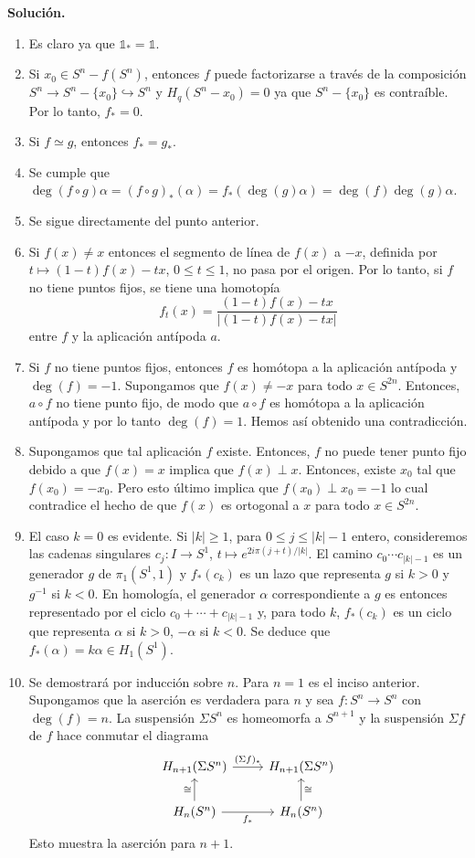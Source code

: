 \documentclass[11pt,a4paper]{article}
\theoremstyle{plain}
\theoremstyle{definition}
\theoremstyle{remark}
\begin{document}
\begin{enumerate}[label=\arabic*.,leftmargin=*]
\noindent\textbf{Solución.}
\begin{enumerate}[label=\alph*)]
\item Es claro ya que $\mathbb 1_*=\mathbb 1$.
\item Si $x_0\in S^n-f(S^n)$, entonces $f$ puede factorizarse a través de
la composición $S^n\to S^n-\{x_0\}\hookrightarrow S^n$ y
$H_q(S^n-x_0)=0$ ya que $S^n-\{x_0\}$ es contraíble. Por lo tanto, $f_*=0$.
\item Si $f\simeq g$, entonces $f_*=g_*$.
\item Se cumple que
$\deg(f\circ g)\alpha=(f\circ g)_*(\alpha)=f_*(\deg(g)\alpha)=\deg(f)\deg(g)\alpha$.
\item Se sigue directamente del punto anterior.
\item Si $f(x)\ne x$ entonces el segmento de línea de $f(x)$ a $-x$,
definida por $t\mapsto(1-t)f(x)-tx$, $0\le t\le1$, no pasa por el origen.
Por lo tanto, si $f$ no tiene puntos fijos, se tiene una homotopía
\[
f_t(x)=\frac{(1-t)f(x)-tx}{|(1-t)f(x)-tx|}
\]
entre $f$ y la aplicación antípoda $a$.
\item Si $f$ no tiene puntos fijos, entonces $f$ es homótopa a la
aplicación antípoda y $\deg(f)=-1$. Supongamos que $f(x)\ne-x$ para todo
$x\in S^{2n}$. Entonces, $a\circ f$ no tiene punto fijo, de modo que
$a\circ f$ es homótopa a la aplicación antípoda y por lo tanto
$\deg(f)=1$. Hemos así obtenido una contradicción.
\item Supongamos que tal aplicación $f$ existe. Entonces, $f$ no puede
tener punto fijo debido a que $f(x)=x$ implica que $f(x)\perp x$. Entonces,
existe $x_0$ tal que $f(x_0)=-x_0$. Pero esto último implica que
$f(x_0)\perp x_0=-1$ lo cual contradice el hecho de que $f(x)$ es ortogonal
a $x$ para todo $x\in S^{2n}$.
\item El caso $k=0$ es evidente. Si $|k|\ge1$, para $0\le j\le|k|-1$
entero, consideremos las cadenas singulares $c_j:I\to S^1$,
$t\mapsto e^{2i\pi(j+t)/|k|}$. El camino $c_0\cdots c_{|k|-1}$ es un
generador $g$ de $\pi_1(S^1,1)$ y $f_*(c_k)$ es un lazo que representa $g$
si $k>0$ y $g^{-1}$ si $k<0$. En homología, el generador $\alpha$
correspondiente a $g$ es entonces representado por el ciclo
$c_0+\cdots+c_{|k|-1}$ y, para todo $k$, $f_*(c_k)$ es un ciclo que
representa $\alpha$ si $k>0$, $-\alpha$ si $k<0$. Se deduce que
$f_*(\alpha)=k\alpha\in H_1(S^1)$.
\item Se demostrará por inducción sobre $n$. Para $n=1$ es el inciso
anterior. Supongamos que la aserción es verdadera para $n$ y sea
$f:S^n\to S^n$ con $\deg(f)=n$. La suspensión $\Sigma S^n$ es homeomorfa a
$S^{n+1}$ y la suspensión $\Sigma f$ de $f$ hace conmutar el diagrama
\[
\begin{tikzcd}
H_{n+1}(\Sigma S^n) \arrow[r,"(\Sigma f)_*"] & H_{n+1}(\Sigma S^n) \\
H_n(S^n) \arrow[u,"\cong"] \arrow[r,swap,"f_*"] & H_n(S^n) \arrow[u,swap,"\cong"]
\end{tikzcd}
\]
Esto muestra la aserción para $n+1$.
\end{enumerate}


\end{enumerate}
\end{document}
